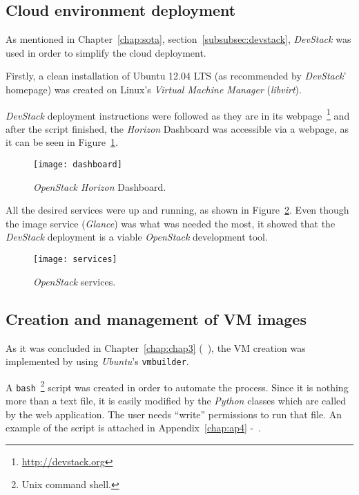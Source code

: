 \subsection{Cloud environment deployment}\label{subsec:cloud_env}

As mentioned in Chapter~\ref{chap:sota}, section~\ref{subsubsec:devstack}, \textit{DevStack} was used in order to simplify the cloud deployment.

Firstly, a clean installation of Ubuntu 12.04 LTS (as recommended by \textit{DevStack}' homepage) was created on Linux's \textit{Virtual Machine Manager} (\textit{libvirt}).

\textit{DevStack} deployment instructions were followed as they are in its webpage~\footnote{\url{http://devstack.org}} and after the script finished, the \textit{Horizon} Dashboard was accessible via a webpage, as it can be seen in Figure~\ref{fig:stack-dashboard}.

\begin{figure}[t]
  \begin{center}
    \leavevmode
    \texttt{[image: dashboard]}
    \caption{\textit{OpenStack Horizon} Dashboard.}
    \label{fig:stack-dashboard}
  \end{center}
\end{figure}

All the desired services were up and running, as shown in Figure~\ref{fig:services}. Even though the image service (\textit{Glance}) was what was needed the most, it showed that the \textit{DevStack} deployment is a viable \textit{OpenStack} development tool.

\begin{figure}[h]
  \begin{center}
    \leavevmode
    \texttt{[image: services]}
    \caption{\textit{OpenStack} services.}
    \label{fig:services}
  \end{center}
\end{figure}

\subsection{Creation and management of VM images}\label{subsec:vm-create-manage}

As it was concluded in Chapter~\ref{chap:chap3} (~), the VM creation was implemented by using \textit{Ubuntu}'s \texttt{vmbuilder}. 

A \texttt{bash}~\footnote{Unix command shell.} script was created in order to automate the process. Since it is nothing more than a text file, it is easily modified by the \textit{Python} classes which are called by the web application. The user needs ``write'' permissions to run that file. An example of the script is attached in Appendix~\ref{chap:ap4} -~.

